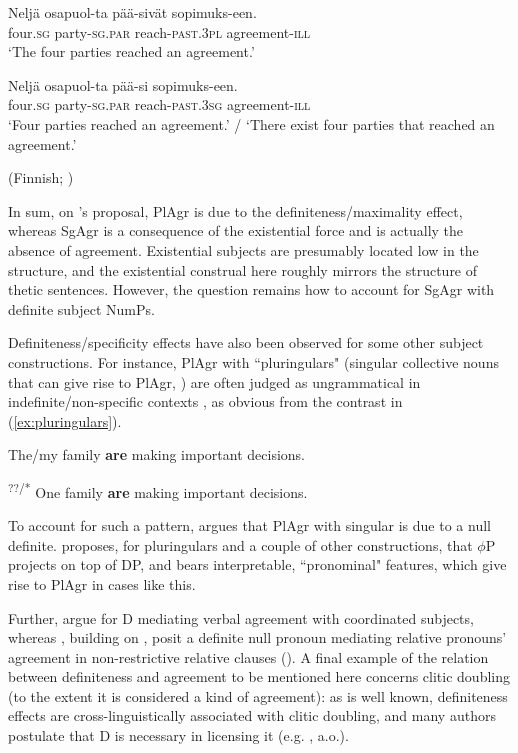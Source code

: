 \documentclass[output=paper,colorlinks,citecolor=brown
]{langscibook}
\begin{document}
\ea \label{ex:Fin-agreement}
\begin{xlist}
\ex \label{ex:finnish-1}
\gll Neljä osapuol-ta pää-sivät sopimuks-een.\\
     four.\textsc{sg} party-\textsc{sg.par} reach-\textsc{past.3pl} agreement-\textsc{ill}\\
\glt `The four parties reached an agreement.' 

\ex \label{ex:finnish-2}
\gll Neljä osapuol-ta pää-si sopimuks-een.\\
     four.\textsc{sg} party-\textsc{sg.par} reach-\textsc{past.3sg} agreement-\textsc{ill}\\
\glt `Four parties reached an agreement.' / `There exist four parties that reached an agreement.' 
\end{xlist}
\z \hfill{(Finnish; \citealt[427]{Kaiser2022salt})}


\noindent In sum, on \citet{Kaiser2022salt}'s proposal, PlAgr is due to the definiteness/maximality effect, whereas SgAgr is a consequence of the existential force and is actually the absence of agreement. Existential subjects are presumably located low in the structure, and the existential construal here roughly mirrors the structure of thetic sentences. However, the question remains how to account for SgAgr with definite subject NumPs.

Definiteness/specificity effects have also been observed for some other subject constructions. For instance, PlAgr with “pluringulars" (singular collective nouns that can give rise to PlAgr, \citealt{DenDikken2001}) are often judged as ungrammatical in indefinite/non-specific contexts \citep[106]{Danon2014}, as obvious from the contrast in (\ref{ex:pluringulars}).

\ea \label{ex:pluringulars}
\begin{xlist}
  \ex The/my family \textbf{are} making important decisions.

  \ex \textsuperscript{??/*} One family \textbf{are} making important decisions.
\end{xlist}
\z

\noindent To account for such a pattern, \citet{Sauerland2004snippets} argues that PlAgr with singular is due to a null definite. \citet{sauerland2004} proposes, for pluringulars and a couple of other constructions, that $\phi$P projects on top of DP, and bears interpretable, ``pronominal" features, which give rise to PlAgr in cases like this. 

Further, \citet{mitic-arsenijevic-2019} argue for D mediating verbal agreement with coordinated subjects, whereas \citet{Arsenijevic2016pluringulars}, building on \citet{Postal1994, deVries2002, deVries2006}, posit a definite null pronoun mediating relative pronouns' agreement in non-restrictive relative clauses (\citealt{Arsenijevic2016pluringulars}). A final example of the relation between definiteness and agreement to be mentioned here concerns clitic doubling (to the extent it is considered a kind of agreement): as is well known, definiteness effects are cross-linguistically associated with clitic doubling, and many authors postulate that D is necessary in licensing it (e.g. \citealt{Boskovic2008a, Kallulli2016}, a.o.). 
\end{document}
